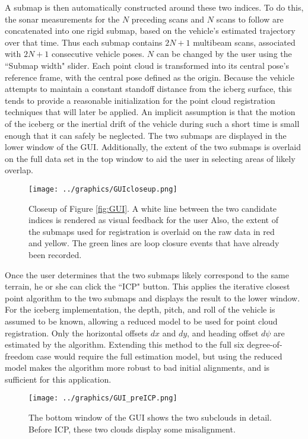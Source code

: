 A submap is then automatically constructed around these two indices. To do this, the sonar measurements for the $N$ preceding scans and $N$ scans to follow are concatenated into one rigid submap, based on the vehicle's estimated trajectory over that time. Thus each submap contains $2N+1$ multibeam scans, associated with $2N+1$ consecutive vehicle poses. $N$ can be changed by the user using the ``Submap width" slider. Each point cloud is transformed into its central pose's reference frame, with the central pose defined as the origin. Because the vehicle attempts to maintain a constant standoff distance from the icberg surface, this tends to provide a reasonable initialization for the point cloud registration techniques that will later be applied. An implicit assumption is that the motion of the iceberg or the inertial drift of the vehicle during such a short time is small enough that it can safely be neglected. The two submaps are displayed in the lower window of the GUI. Additionally, the extent of the two submaps is overlaid on the full data set in the top window to aid the user in selecting areas of likely overlap.

 \begin{figure}[htbp]
   \centering
   \texttt{[image: ../graphics/GUIcloseup.png]} %
   \caption{Closeup of Figure \ref{fig:GUI}. A white line between the two candidate indices is rendered as visual feedback for the user Also, the extent of the submaps used for registration is overlaid on the raw data in red and yellow. The green lines are loop closure events that have already been recorded.}
   \label{fig:GUIcloseup}
\end{figure}

Once the user determines that the two submaps likely correspond to the same terrain, he or she can click the ``ICP" button. This applies the iterative closest point algorithm to the two submaps and displays the result to the lower window. For the iceberg implementation, the depth, pitch, and roll of the vehicle is assumed to be known, allowing a reduced model to be used for point cloud registration. Only the horizontal offsets $dx$ and $dy$, and heading offset $d\psi$ are estimated by the algorithm. Extending this method to the full six degree-of-freedom case would require the full estimation model, but using the reduced model makes the algorithm more robust to bad initial alignments, and is sufficient for this application. 
 
 \begin{figure}[htbp]
   \centering
   \texttt{[image: ../graphics/GUI\_preICP.png]} %
   \caption{The bottom window of the GUI shows the two subclouds in detail. Before ICP, these two clouds display some misalignment.}
   \label{fig:GUI_preicp}
\end{figure}

